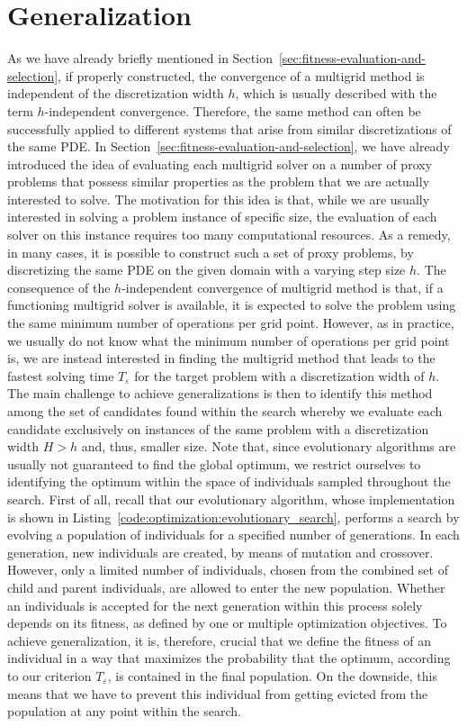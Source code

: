 \section{Generalization}
As we have already briefly mentioned in Section~\ref{sec:fitness-evaluation-and-selection}, if properly constructed, the convergence of a multigrid method is independent of the discretization width $h$, which is usually described with the term $h$-independent convergence.
Therefore, the same method can often be successfully applied to different systems that arise from similar discretizations of the same PDE.
In Section~\ref{sec:fitness-evaluation-and-selection}, we have already introduced the idea of evaluating each multigrid solver on a number of proxy problems that possess similar properties as the problem that we are actually interested to solve.
The motivation for this idea is that, while we are usually interested in solving a problem instance of specific size, the evaluation of each solver on this instance requires too many computational resources.
As a remedy, in many cases, it is possible to construct such a set of proxy problems, by discretizing the same PDE on the given domain with a varying step size $h$.
The consequence of the $h$-independent convergence of multigrid method is that, if a functioning multigrid solver is available, it is expected to solve the problem using the same minimum number of operations per grid point.
However, as in practice, we usually do not know what the minimum number of operations per grid point is, we are instead interested in finding the multigrid method that leads to the fastest solving time $T_\varepsilon$ for the target problem with a discretization width of $h$.
The main challenge to achieve generalizations is then to identify this method among the set of candidates found within the search whereby we evaluate each candidate exclusively on instances of the same problem with a discretization width $H > h$ and, thus, smaller size.
Note that, since evolutionary algorithms are usually not guaranteed to find the global optimum, we restrict ourselves to identifying the optimum within the space of individuals sampled throughout the search.
First of all, recall that our evolutionary algorithm, whose implementation is shown in Listing~\ref{code:optimization:evolutionary_search}, performs a search by evolving a population of individuals for a specified number of generations.
In each generation, new individuals are created, by means of mutation and crossover.
However, only a limited number of individuals, chosen from the combined set of child and parent individuals, are allowed to enter the new population.
Whether an individuals is accepted for the next generation within this process solely depends on its fitness, as defined by one or multiple optimization objectives.
To achieve generalization, it is, therefore, crucial that we define the fitness of an individual in a way that maximizes the probability that the optimum, according to our criterion $T_{\varepsilon}$, is contained in the final population.
On the downside, this means that we have to prevent this individual from getting evicted from the population at any point within the search.
